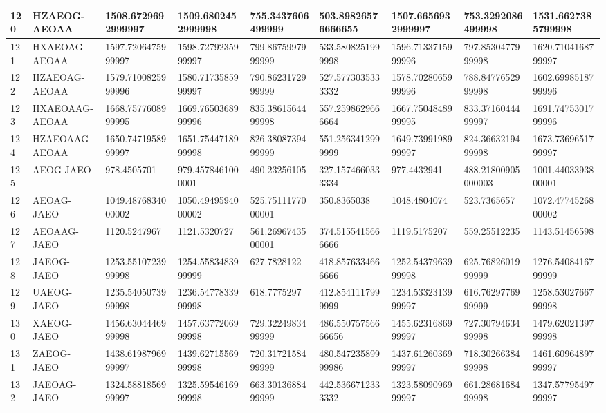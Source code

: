 {\begin{longtable}{|l|l|l|l|l|l|l|l|l|}
        120 & HZAEOG-AEOAA & 1508.6729692999997 & 1509.6802452999998 & 755.3437606499999 & 503.89826576666655 & 1507.6656932999997 & 753.3292086499998 & 1531.6627385799998 \\ \hline
        121 & HXAEOAG-AEOAA & 1597.7206475999997 & 1598.7279235999997 & 799.8675997999999 & 533.5808251999998 & 1596.7133715999996 & 797.8530477999998 & 1620.7104168799997 \\ \hline
        122 & HZAEOAG-AEOAA & 1579.7100825999996 & 1580.7173585999997 & 790.8623172999999 & 527.5773035333332 & 1578.7028065999996 & 788.8477652999998 & 1602.6998518799996 \\ \hline
        123 & HXAEOAAG-AEOAA & 1668.7577608999995 & 1669.7650368999996 & 835.3861564499998 & 557.2598629666664 & 1667.7504848999995 & 833.3716044499997 & 1691.7475301799996 \\ \hline
        124 & HZAEOAAG-AEOAA & 1650.7471958999997 & 1651.7544718999998 & 826.3808739499999 & 551.2563412999999 & 1649.7399198999997 & 824.3663219499998 & 1673.7369651799997 \\ \hline
        125 & AEOG-JAEO & 978.4505701 & 979.4578461000001 & 490.23256105 & 327.1574660333334 & 977.4432941 & 488.21800905000003 & 1001.4403393800001 \\ \hline
        126 & AEOAG-JAEO & 1049.4876834000002 & 1050.4949594000002 & 525.7511177000001 & 350.8365038 & 1048.4804074 & 523.7365657 & 1072.4774526800002 \\ \hline
        127 & AEOAAG-JAEO & 1120.5247967 & 1121.5320727 & 561.2696743500001 & 374.5155415666666 & 1119.5175207 & 559.25512235 & 1143.51456598 \\ \hline
        128 & JAEOG-JAEO & 1253.5510723999998 & 1254.5583483999999 & 627.7828122 & 418.8576334666666 & 1252.5437963999998 & 625.7682601999999 & 1276.5408416799999 \\ \hline
        129 & UAEOG-JAEO & 1235.5405073999998 & 1236.5477833999998 & 618.7775297 & 412.8541117999999 & 1234.5332313999997 & 616.7629776999999 & 1258.5302766799998 \\ \hline
        130 & XAEOG-JAEO & 1456.6304446999998 & 1457.6377206999998 & 729.3224983499999 & 486.55075756666656 & 1455.6231686999997 & 727.3079463499998 & 1479.6202139799998 \\ \hline
        131 & ZAEOG-JAEO & 1438.6198796999997 & 1439.6271556999998 & 720.3172158499999 & 480.54723589999986 & 1437.6126036999997 & 718.3026638499998 & 1461.6096489799997 \\ \hline
        132 & JAEOAG-JAEO & 1324.5881856999997 & 1325.5954616999998 & 663.3013688499999 & 442.5366712333332 & 1323.5809096999997 & 661.2868168499998 & 1347.5779549799997 \\ \hline

\end{longtable}}
